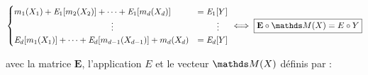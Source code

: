 {{        \begin{equation}
            \begin{cases}
                m_1(X_1) + \mathit E_1 [m_2(X_2)] + \dots + \mathit E_1[m_d(X_d)]            & = \mathit E_1[Y]      \\
                \hspace{4cm} \vdots                                                          & \hspace{0.8cm} \vdots \\
                \mathit E_d [m_1(X_1)]  + \dots + \mathit E_d [m_{d-1}(X_{d-1})]  + m_d(X_d) & = \mathit E_d[Y]
            \end{cases}
            \iff \boxed{\mathbf E \circ \grandM(X) = E \circ Y}
        \end{equation}

        \bigskip

        \noindent avec la matrice $\mathbf E$, l'application $E$ et le vecteur $\grandM(X)$ définis par :

}}
